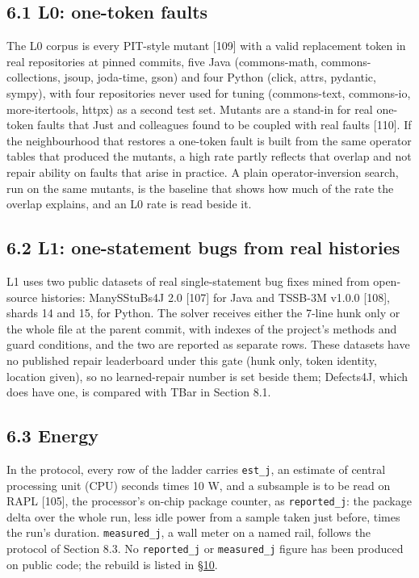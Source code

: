 \documentclass[10pt,letterpaper]{article}
\begin{document}
\subsection{6.1 L0: one-token faults}\label{l0-one-token-faults}

The L0 corpus is every PIT-style mutant {[}109{]} with a valid
replacement token in real repositories at pinned commits, five Java
(commons-math, commons-collections, jsoup, joda-time, gson) and four
Python (click, attrs, pydantic, sympy), with four repositories never
used for tuning (commons-text, commons-io, more-itertools, httpx) as a
second test set. Mutants are a stand-in for real one-token faults that
Just and colleagues found to be coupled with real faults {[}110{]}. If
the neighbourhood that restores a one-token fault is built from the same
operator tables that produced the mutants, a high rate partly reflects
that overlap and not repair ability on faults that arise in practice. A
plain operator-inversion search, run on the same mutants, is the
baseline that shows how much of the rate the overlap explains, and an L0
rate is read beside it.

\subsection{6.2 L1: one-statement bugs from real
histories}\label{l1-one-statement-bugs-from-real-histories}

L1 uses two public datasets of real single-statement bug fixes mined
from open-source histories: ManySStuBs4J 2.0 {[}107{]} for Java and
TSSB-3M v1.0.0 {[}108{]}, shards 14 and 15, for Python. The solver
receives either the 7-line hunk only or the whole file at the parent
commit, with indexes of the project's methods and guard conditions, and
the two are reported as separate rows. These datasets have no published
repair leaderboard under this gate (hunk only, token identity, location
given), so no learned-repair number is set beside them; Defects4J, which
does have one, is compared with TBar in Section 8.1.

\subsection{6.3 Energy}\label{energy}

In the protocol, every row of the ladder carries \texttt{est\_j}, an
estimate of central processing unit (CPU) seconds times 10 W, and a
subsample is to be read on RAPL {[}105{]}, the processor's on-chip
package counter, as \texttt{reported\_j}: the package delta over the
whole run, less idle power from a sample taken just before, times the
run's duration. \texttt{measured\_j}, a wall meter on a named rail,
follows the protocol of Section 8.3. No \texttt{reported\_j} or
\texttt{measured\_j} figure has been produced on public code; the
rebuild is listed in
\href{https://research.openie.dev/papers/rce/\#10-work-to-finish}{§10}.
\end{document}
